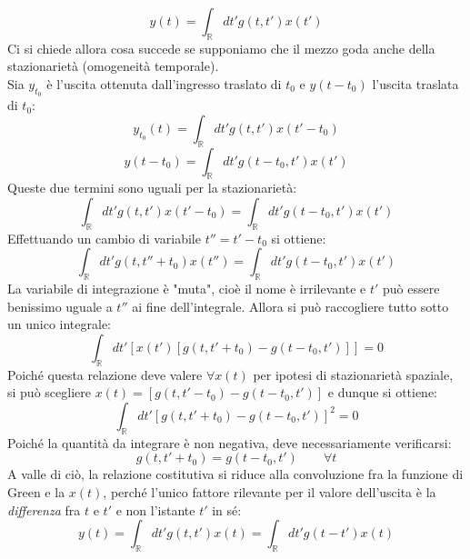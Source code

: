 \documentclass{book}
\begin{document}
            \begin{equation}
                y(t) = \int_{\mathbb{R}} dt' g(t, t') x(t')
            \end{equation}
            Ci si chiede allora cosa succede se supponiamo che il mezzo goda anche della stazionarietà (omogeneità temporale). \\ Sia $y_{t_{0}}$ è l'uscita ottenuta dall'ingresso traslato di $t_{0}$ e $y(t-t_{0})$ l'uscita traslata di $t_{0}$:
            \begin{equation}
                y_{t_{0}}(t) = \int_{\mathbb{R}} dt' g(t, t') x(t'-t_{0})
            \end{equation}
            \begin{equation}
                y(t-t_{0}) = \int_{\mathbb{R}} dt' g(t-t_{0},t') x(t')
            \end{equation}
            Queste due termini sono uguali per la stazionarietà:
            \begin{equation}
                \int_{\mathbb{R}} dt' g(t, t') x(t'-t_{0}) = \int_{\mathbb{R}} dt' g(t-t_{0},t') x(t')
            \end{equation}
            Effettuando un cambio di variabile $t'' = t'-t_0$ si ottiene:
            \begin{equation}
                \int_{\mathbb{R}} dt' g(t, t''+t_{0}) x(t'') = \int_{\mathbb{R}} dt' g(t-t_{0},t') x(t')
            \end{equation}
            La variabile di integrazione è "muta", cioè il nome è irrilevante e $t'$ può essere benissimo uguale a $t''$ ai fine dell'integrale. Allora si può raccogliere tutto sotto un unico integrale:
            \begin{equation}
                \int_{\mathbb{R}} dt'[x(t')[g(t, t'+t_{0})-g(t-t_{0}, t')]] = 0
            \end{equation}
            Poiché questa relazione deve valere $\forall x(t)$ per ipotesi di stazionarietà spaziale, si può scegliere $x(t) = [g(t, t'-t_{0})-g(t-t_{0}, t')]$ e dunque si ottiene:
            \begin{equation}
                \int_{\mathbb{R}} dt'[g(t, t'+t_{0})-g(t-t_{0}, t')]^{2} = 0
            \end{equation}
            Poiché la quantità da integrare è non negativa, deve necessariamente verificarsi:
            \begin{equation}
                g(t, t'+t_{0})=g(t-t_{0}, t')  \qquad \forall t
            \end{equation}
            A valle di ciò, la relazione costitutiva si riduce alla convoluzione fra la funzione di Green e la $x(t)$, perché l'unico fattore rilevante per il valore dell'uscita è la \textit{differenza} fra $t$ e $t'$ e non l'istante $t'$ in sé:
            \begin{equation}
                y(t) = \int_{\mathbb{R}} dt' g(t,t')x(t) = \int_{\mathbb{R}} dt' g(t-t')x(t)
            \end{equation}
\end{document}
